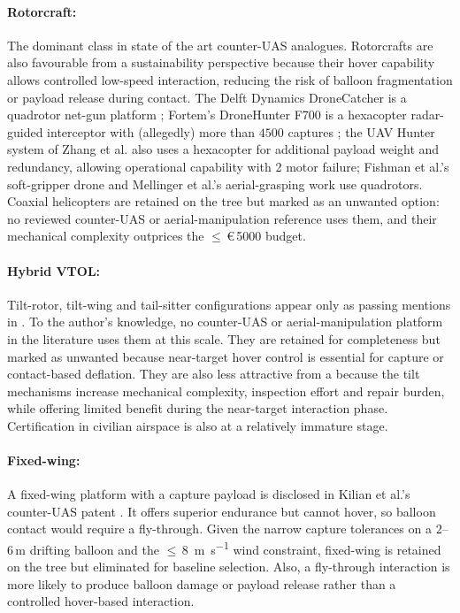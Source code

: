 \paragraph{Rotorcraft:} The dominant class in state of the art  counter-UAS analogues. Rotorcrafts are also favourable from a sustainability perspective because their hover capability allows controlled low-speed interaction, reducing the risk of balloon fragmentation or payload release during contact. The Delft Dynamics DroneCatcher is a quadrotor net-gun platform \cite{DroneCatcher}; Fortem's DroneHunter F700 is a hexacopter radar-guided interceptor with (allegedly) more than $4500$ captures \cite{Fortem}; the UAV Hunter system of Zhang et al. \cite{Zhang2024UAVDefense} also uses a hexacopter for additional payload weight and redundancy, allowing operational capability with 2 motor failure; Fishman et al.'s soft-gripper drone \cite{Fishman2021DynamicPractice} and Mellinger et al.'s aerial-grasping work \cite{Mellinger20112011Systems} use quadrotors. Coaxial helicopters are retained on the tree but marked as an unwanted option: no reviewed counter-UAS or aerial-manipulation reference uses them, and their mechanical complexity outprices the $\leq$\,\euro\,5000 budget.

\paragraph{Hybrid VTOL:} Tilt-rotor, tilt-wing and tail-sitter configurations appear only as passing mentions in \cite{Ruggiero2018AerialReview}. To the author's knowledge, no counter-UAS or aerial-manipulation platform in the literature uses them at this scale. They are retained for completeness but marked as unwanted because near-target hover control is essential for capture or contact-based deflation. They are also less attractive from a because the tilt mechanisms increase mechanical complexity, inspection effort and repair burden, while offering limited benefit during the near-target interaction phase. Certification in civilian airspace is also at a relatively immature stage.

\paragraph{Fixed-wing:} A fixed-wing platform with a capture payload is disclosed in Kilian et al.'s counter-UAS patent \cite{Killianetal}. It offers superior endurance but cannot hover, so balloon contact would require a fly-through. Given the narrow capture tolerances on a $2$--$6\,\mathrm{m}$ drifting balloon and the $\leq$\,\SI{8}{\meter\per\second} wind constraint, fixed-wing is retained on the tree but eliminated for baseline selection. Also, a fly-through interaction is more likely to produce balloon damage or payload release rather than a controlled hover-based interaction.

